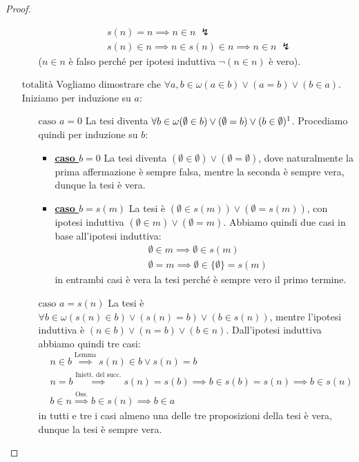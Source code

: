 \documentclass[11pt]{scrartcl}
\begin{document}
\begin{proof}
\begin{itemize}
\begin{itemize}
			\[ \begin{split}
				& s(n) = n \implies n \in n \; \lightning\\
				& s(n) \in n \implies n \in s(n) \in n \implies n \in n \; \lightning
			\end{split}
				\]
			($n \in n$ è falso perché per ipotesi induttiva $\neg(n \in n)$ è vero).
		\end{itemize}
		\item[$\boxed{\text{totalità}}$] Vogliamo dimostrare che $\forall a,b \in \omega (a \in b) \lor (a = b) \lor (b \in a)$. Iniziamo per induzione su $a$:
		\begin{itemize}
			\item[$\boxed{\text{caso $a = 0$}}$] La tesi diventa $\forall b \in \omega (\emptyset \in b) \lor (\emptyset = b) \lor (b \in \emptyset) \footnote{Ovviamente quest'ultimo caso è sempre faslo e quindi può essere escluso.}$. Procediamo quindi per induzione su $b$:
			\begin{itemize}
				\item \textbf{\underline{caso $b = 0$}} La tesi diventa $(\emptyset \in \emptyset) \lor (\emptyset = \emptyset)$, dove naturalmente la prima affermazione è sempre falsa, mentre la seconda è sempre vera, dunque la tesi è vera.
				\item \textbf{\underline{caso $b = s(m)$}} La tesi è $(\emptyset \in s(m)) \lor (\emptyset = s(m))$, con ipotesi induttiva $(\emptyset \in m) \lor (\emptyset = m)$. Abbiamo quindi due casi in base all'ipotesi induttiva:
				\[ \begin{split}
					& \emptyset \in m \implies \emptyset \in s(m) \\
					& \emptyset = m \implies \emptyset \in \{\emptyset\} = s(m)
				\end{split}
					\]
				in entrambi casi è vera la tesi perché è sempre vero il primo termine.
			\end{itemize}
			\item[$\boxed{\text{caso $a = s(n)$}}$] La tesi è $\forall b \in \omega (s(n) \in b) \lor (s(n) = b) \lor (b \in s(n))$, mentre l'ipotesi induttiva è $(n \in b) \lor (n = b) \lor (b \in n)$. Dall'ipotesi induttiva abbiamo quindi tre casi:
				\[ \begin{split}
					& n \in b \overset{\text{Lemma}}{\implies} s(n) \in b \lor s(n) = b \\
					& n = b \overset{\text{Iniett. del succ.}}{\implies} s(n) = s(b) \implies b \in s(b) = s(n) \implies b \in s(n)\\
					& b \in n \overset{\text{Oss.}}{\implies} b \in s(n) \implies b \in a 
				\end{split}
					\]
				in tutti e tre i casi almeno una delle tre proposizioni della tesi è vera, dunque la tesi è sempre vera.
		\end{itemize}
	\end{itemize}
\end{proof}
\end{document}
